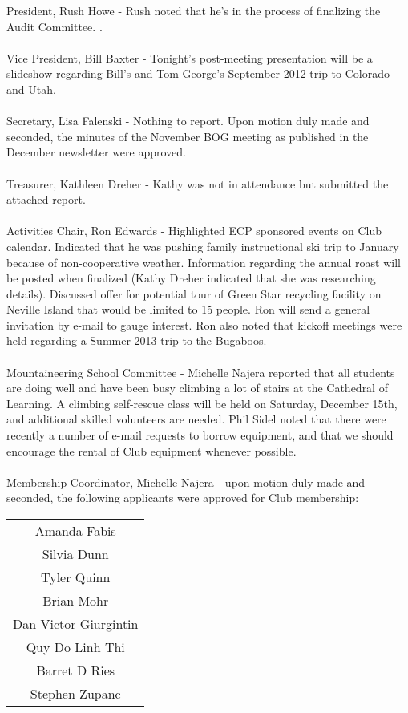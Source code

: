 \documentclass[10pt,a4paper]{article}
\begin{document}
\begin{multicols}{2}
President, Rush Howe - Rush noted that he's in the process of finalizing the Audit Committee.   .
\\
\\
Vice President, Bill Baxter -  Tonight's post-meeting presentation will be a slideshow regarding Bill's and Tom George's September 2012 trip to Colorado and Utah.
\\
\\
Secretary, Lisa Falenski - Nothing to report.  Upon motion duly made and seconded, the minutes of the November BOG meeting as published in the December newsletter were approved.
\\
\\
Treasurer, Kathleen Dreher - Kathy was not in attendance but submitted the attached report.
\\
\\
Activities Chair, Ron Edwards - Highlighted ECP sponsored events on Club calendar. Indicated that he was pushing family instructional ski trip to January because of non-cooperative weather.  Information regarding the annual roast will be posted when finalized (Kathy Dreher indicated that she was researching details). Discussed offer for potential tour of Green Star recycling facility on Neville Island that would be limited to 15 people.  Ron will send a general invitation by e-mail to gauge interest. Ron also noted that kickoff meetings were held regarding a Summer 2013 trip to the Bugaboos.
\\
\\
Mountaineering School Committee - Michelle Najera reported that all students are doing well and have been busy climbing a lot of stairs at the Cathedral of Learning. A climbing self-rescue class will be held on Saturday, December 15th, and additional skilled volunteers are needed. Phil Sidel noted that there were recently a number of e-mail requests to borrow equipment, and that we should encourage the rental of Club equipment whenever possible.
\\
\\
Membership Coordinator, Michelle Najera - upon motion duly made and seconded, the following applicants were approved for Club membership:

\begin{center}
	\begin{tabular}{c}
		Amanda Fabis \\
		Silvia Dunn \\
		Tyler Quinn \\
		Brian Mohr \\
		Dan-Victor Giurgintin \\
		Quy Do Linh Thi \\
		Barret D Ries \\
		Stephen Zupanc \\
	\end{tabular}
\end{center}


\end{multicols}
\end{document}
